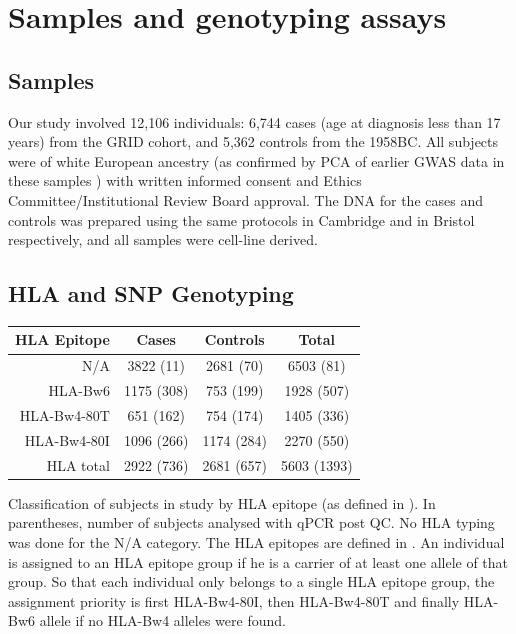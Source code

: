\section{Samples and genotyping assays}

\subsection{Samples}

Our study involved 12,106 individuals: 6,744 cases (age at diagnosis
less than 17 years) from the \gls{GRID} cohort,
and 5,362 controls from the \gls{1958BC}.  All
subjects were of white European ancestry
(as confirmed by \gls{PCA} of earlier GWAS data in these samples \citep{Barrett:2009jq})
with written informed consent
and Ethics Committee/Institutional Review Board approval.
The DNA for the cases and controls was prepared using the same protocols in
Cambridge and in Bristol respectively, and all samples were cell-line derived.  


\subsection{HLA and SNP Genotyping}


\begin{table} [h]
\begin{center}
\footnotesize
\begin{tabular}{rccc}
  \hline
  HLA Epitope & Cases & Controls & Total \\
  \hline
    N/A & 3822 (11) & 2681 (70) & 6503 (81) \\
    \hline
    HLA-Bw6     & 1175 (308) & 753 (199)  & 1928 (507) \\
    HLA-Bw4-80T & 651 (162)  & 754 (174)  & 1405 (336) \\
    HLA-Bw4-80I & 1096 (266) & 1174 (284) & 2270 (550) \\
    \hline
    HLA total & 2922 (736) & 2681 (657) & 5603 (1393) \\
\end{tabular}
\end{center}
{Classification of subjects in study by HLA epitope (as defined in ).}
{
In parentheses, number of subjects analysed with qPCR post QC.
No HLA typing was done for the N/A category.
The HLA epitopes are defined in .
An individual is assigned to an HLA epitope group if he is a carrier of at least one allele of that group.
So that each individual only belongs to a single HLA epitope group,
the assignment priority is first HLA-Bw4-80I, then HLA-Bw4-80T and finally HLA-Bw6 allele if no HLA-Bw4 alleles 
were found.
}
\end{table}

